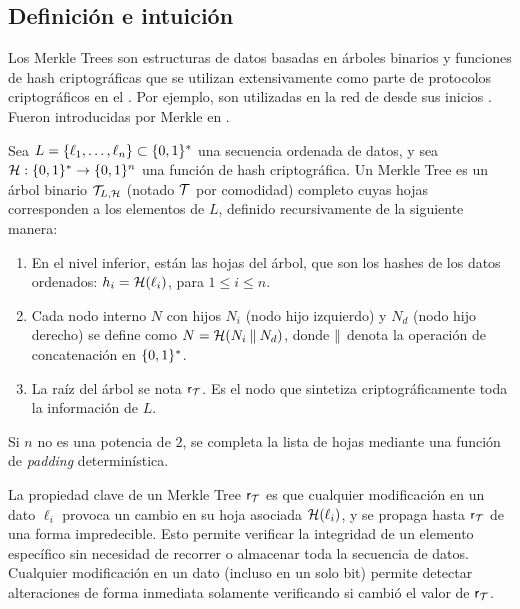 
\subsection{Definición e intuición}
\label{subsec:apendice-a-merkle-tree-definicion-e-intuicion}

Los Merkle Trees son estructuras de datos basadas en árboles binarios y funciones de hash criptográficas que se utilizan extensivamente como parte de protocolos criptográficos en el \ROM. Por ejemplo, son utilizadas en la red de \Bitcoin desde sus inicios \cite{nakamoto2009bitcoin}. Fueron introducidas por Merkle en \cite{Merkle1988}.

\begin{definition}
\label{def:apendice-a-merkle-tree-merkle-tree}
	Sea $L = \{\ell_1, \ldots, \ell_n\} \subset \{0,1\}^{*}$ una secuencia ordenada de datos, y sea $\mathcal{H}: \{0,1\}^{*} \to \{0,1\}^{n}$ una función de hash criptográfica. Un Merkle Tree es un árbol binario $\mathcal{T}_{L,\mathcal{H}}$ (notado $\mathcal{T}$ por comodidad) completo cuyas hojas corresponden a los elementos de $L$, definido recursivamente de la siguiente manera:
	\begin{enumerate}
		\item En el nivel inferior, están las hojas del árbol, que son los hashes de los datos ordenados: $h_i = \mathcal{H}(\ell_i)$, para $1 \leq i \leq n$.
		\item Cada nodo interno $N$ con hijos $N_i$ (nodo hijo izquierdo) y $N_d$ (nodo hijo derecho) se define como $N = \mathcal{H}(N_i \mathbin{\|} N_d)$, donde $\mathbin{\|}$ denota la operación de concatenación en $\{0,1\}^{*}$.
		\item La raíz del árbol se nota $\mathsf{r}_{\mathcal{T}}$. Es el nodo que sintetiza criptográficamente toda la información de $L$.
	\end{enumerate}
	 Si $n$ no es una potencia de $2$, se completa la lista de hojas mediante una función de \textit{padding} determinística.
\end{definition}

La propiedad clave de un Merkle Tree $\mathsf{r}_{\mathcal{T}}$ es que cualquier modificación en un dato $\ell_i$ provoca un cambio en su hoja asociada $\mathcal{H}(\ell_i)$, y se propaga hasta $\mathsf{r}_{\mathcal{T}}$ de una forma impredecible. Esto permite verificar la integridad de un elemento específico sin necesidad de recorrer o almacenar toda la secuencia de datos. Cualquier modificación en un dato (incluso en un solo bit) permite detectar alteraciones de forma inmediata solamente verificando si cambió el valor de $\mathsf{r}_{\mathcal{T}}$.

